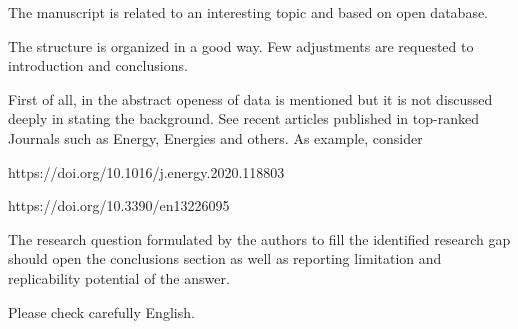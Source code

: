 \documentclass[a4paper,twoside,11pt]{article}
\newcounter{comments}[section]
\newcommand{\rcomment}[1]
{
	\stepcounter{comments}
	\vspace{0.6cm}
	\begin{tcolorbox}[colback=black!5,colframe=white!45!black,title=Comment \arabic{comments}]
		#1
	\end{tcolorbox}
}
\begin{document}
\rcomment{
The manuscript is related to an interesting topic and based on open database.

\vspace{0.5cm}
The structure is organized in a good way. Few adjustments are requested to introduction and conclusions.

\vspace{0.5cm}
First of all, in the abstract openess of data is mentioned but it is not discussed deeply in stating the background. See recent articles published in top-ranked Journals such as Energy, Energies and others. As example, consider

\vspace{0.5cm}
https://doi.org/10.1016/j.energy.2020.118803 

\vspace{0.5cm}
https://doi.org/10.3390/en13226095

\vspace{0.5cm}
The research question formulated by the authors to fill the identified research gap should open the conclusions section as
well as reporting limitation and replicability potential of the answer.

\vspace{0.5cm}
Please check carefully English.
}
\end{document}
